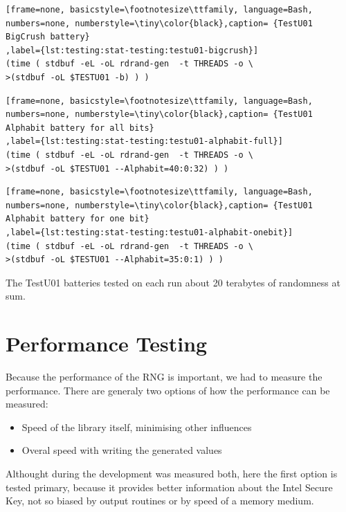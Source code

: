 \begin{lstlisting}[frame=none, basicstyle=\footnotesize\ttfamily, language=Bash, numbers=none, numberstyle=\tiny\color{black},caption= {TestU01 BigCrush battery}
,label={lst:testing:stat-testing:testu01-bigcrush}]
(time ( stdbuf -eL -oL rdrand-gen  -t THREADS -o \
>(stdbuf -oL $TESTU01 -b) ) )
\end{lstlisting}

\begin{lstlisting}[frame=none, basicstyle=\footnotesize\ttfamily, language=Bash, numbers=none, numberstyle=\tiny\color{black},caption= {TestU01 Alphabit battery for all bits}
,label={lst:testing:stat-testing:testu01-alphabit-full}]
(time ( stdbuf -eL -oL rdrand-gen  -t THREADS -o \
>(stdbuf -oL $TESTU01 --Alphabit=40:0:32) ) ) 
\end{lstlisting}

\begin{lstlisting}[frame=none, basicstyle=\footnotesize\ttfamily, language=Bash, numbers=none, numberstyle=\tiny\color{black},caption= {TestU01 Alphabit battery for one bit}
,label={lst:testing:stat-testing:testu01-alphabit-onebit}]
(time ( stdbuf -eL -oL rdrand-gen  -t THREADS -o \
>(stdbuf -oL $TESTU01 --Alphabit=35:0:1) ) ) 
\end{lstlisting}


The TestU01 batteries tested on each run about 20 terabytes of randomness at sum. 


\section{Performance Testing} \label{sec:testing:performance-testing}
Because the performance of the RNG is important, we had to measure the performance. There are generaly two options of how the performance can be measured:
\begin{itemize}
 \item Speed of the library itself, minimising other influences
 \item Overal speed with writing the generated values
\end{itemize}
Althought during the development was measured both, here the first option is tested primary, because it provides better information about the Intel Secure Key, not so biased by output routines or by speed of a memory medium. 


